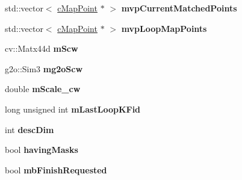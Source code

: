 \begin{DoxyCompactItemize}
\item 
std\+::vector$<$ \hyperlink{classMultiColSLAM_1_1cMapPoint}{c\+Map\+Point} $\ast$ $>$ {\bfseries mvp\+Current\+Matched\+Points}\hypertarget{classMultiColSLAM_1_1cLoopClosing_ab539472f12a69a208521a04b06fd4518}{}\label{classMultiColSLAM_1_1cLoopClosing_ab539472f12a69a208521a04b06fd4518}

\item 
std\+::vector$<$ \hyperlink{classMultiColSLAM_1_1cMapPoint}{c\+Map\+Point} $\ast$ $>$ {\bfseries mvp\+Loop\+Map\+Points}\hypertarget{classMultiColSLAM_1_1cLoopClosing_aec46eb0127336b953a1f96d42b4bec7e}{}\label{classMultiColSLAM_1_1cLoopClosing_aec46eb0127336b953a1f96d42b4bec7e}

\item 
cv\+::\+Matx44d {\bfseries m\+Scw}\hypertarget{classMultiColSLAM_1_1cLoopClosing_a7eeb3b2933d3bc35509e39264dec314f}{}\label{classMultiColSLAM_1_1cLoopClosing_a7eeb3b2933d3bc35509e39264dec314f}

\item 
g2o\+::\+Sim3 {\bfseries mg2o\+Scw}\hypertarget{classMultiColSLAM_1_1cLoopClosing_a6ffa1ebb6ac500551538b3b36fe3fdf8}{}\label{classMultiColSLAM_1_1cLoopClosing_a6ffa1ebb6ac500551538b3b36fe3fdf8}

\item 
double {\bfseries m\+Scale\+\_\+cw}\hypertarget{classMultiColSLAM_1_1cLoopClosing_aa3a0a6c8f526645a6dbb82ea8511f116}{}\label{classMultiColSLAM_1_1cLoopClosing_aa3a0a6c8f526645a6dbb82ea8511f116}

\item 
long unsigned int {\bfseries m\+Last\+Loop\+K\+Fid}\hypertarget{classMultiColSLAM_1_1cLoopClosing_a9546442617703f79f7b5acaae0a589a0}{}\label{classMultiColSLAM_1_1cLoopClosing_a9546442617703f79f7b5acaae0a589a0}

\item 
int {\bfseries desc\+Dim}\hypertarget{classMultiColSLAM_1_1cLoopClosing_ae5e505c376f7cba08bd301a0a8b08281}{}\label{classMultiColSLAM_1_1cLoopClosing_ae5e505c376f7cba08bd301a0a8b08281}

\item 
bool {\bfseries having\+Masks}\hypertarget{classMultiColSLAM_1_1cLoopClosing_a35e90a600f9a40e684bcd18e2d2f9457}{}\label{classMultiColSLAM_1_1cLoopClosing_a35e90a600f9a40e684bcd18e2d2f9457}

\item 
bool {\bfseries mb\+Finish\+Requested}\hypertarget{classMultiColSLAM_1_1cLoopClosing_a602fe527bf94a357722553d93e136f7d}{}\label{classMultiColSLAM_1_1cLoopClosing_a602fe527bf94a357722553d93e136f7d}


\end{DoxyCompactItemize}
